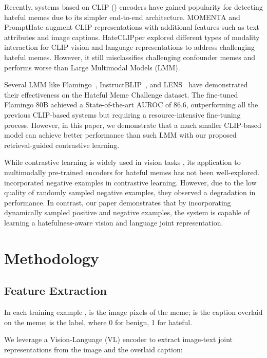 \documentclass[11pt]{article}
\begin{document}
Recently, systems based on CLIP (\cite{clip2021}) encoders have gained popularity for detecting hateful memes due to its simpler end-to-end architecture. MOMENTA \cite{PramanickMomenta2021} and PromptHate \cite{caoPromptHate2022} augment CLIP representations with additional features such as text attributes and image captions.
HateCLIPper \cite{KumarHateClip2022} explored different types of modality interaction for CLIP vision and language representations to address challenging hateful memes. However, it still misclassifies challenging confounder memes and performs worse than Large Multimodal Models (LMM).

Several LMM like Flamingo~\cite{Flamingo22}, InstructBLIP~\cite{DaiInstructBLIP2023}, and LENS~\cite{BerriosLens2023} have demonstrated their effectiveness on the Hateful Meme Challenge dataset. The fine-tuned Flamingo 80B achieved a State-of-the-art AUROC of 86.6, outperforming all the previous CLIP-based systems but requiring a resource-intensive fine-tuning process.  However, in this paper, we demonstrate that a much smaller CLIP-based model can achieve better performance than such LMM with our proposed retrieval-guided contrastive learning.

While contrastive learning is widely used in vision tasks \cite{Schroff_FaceNet_2015, Song_metriclearningLifetedFeatureEmbedding_2016, Harwood_SmartMiningDeepMetricLearning_2017, Suh_StochasticHardExampleMiningForDeepMetricLearning2019}, its application to multimodally pre-trained encoders for hateful memes has not been well-explored. \citet{LippeHMFramework2020} incorporated negative examples in contrastive learning. However, due to the low quality of randomly sampled negative examples, they observed a degradation in performance. In contrast, our paper demonstrates that by incorporating dynamically sampled positive and negative examples, the system is capable of learning a hatefulness-aware vision and language joint representation. 


\section{Methodology}
\subsection{Feature Extraction}
In each training example
,  is the image pixels of the meme;  is the caption overlaid on the meme;  is the label, where 0 for benign, 1 for hateful.

We leverage a Vision-Language (VL) encoder to extract image-text joint representations from the image and the overlaid caption: 
\end{document}
